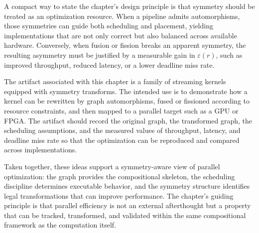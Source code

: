 A compact way to state the chapter's design principle is that symmetry should be treated as an optimization resource. When a pipeline admits automorphisms, those symmetries can guide both scheduling and placement, yielding implementations that are not only correct but also balanced across available hardware. Conversely, when fusion or fission breaks an apparent symmetry, the resulting asymmetry must be justified by a measurable gain in \(\varepsilon(r)\), such as improved throughput, reduced latency, or a lower deadline miss rate.

The artifact associated with this chapter is a family of streaming kernels equipped with symmetry transforms. The intended use is to demonstrate how a kernel can be rewritten by graph automorphisms, fused or fissioned according to resource constraints, and then mapped to a parallel target such as a GPU or FPGA. The artifact should record the original graph, the transformed graph, the scheduling assumptions, and the measured values of throughput, latency, and deadline miss rate so that the optimization can be reproduced and compared across implementations.

Taken together, these ideas support a symmetry-aware view of parallel optimization: the graph provides the compositional skeleton, the scheduling discipline determines executable behavior, and the symmetry structure identifies legal transformations that can improve performance. The chapter's guiding principle is that parallel efficiency is not an external afterthought but a property that can be tracked, transformed, and validated within the same compositional framework as the computation itself.
